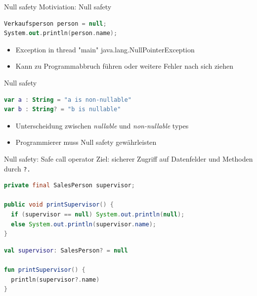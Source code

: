 \documentclass{beamer}
\begin{document}

\begin{frame}[fragile]{Null safety}
  Motiviation: Null safety
  \pause\vspace{1cm}
  \begin{lstlisting}[language=Kotlin, title=Java Beispiel, xleftmargin=1em]
Verkaufsperson person = null;
System.out.println(person.name);
  \end{lstlisting}
  \pause\vspace{1cm}
  \begin{itemize}[<+->]
    \item Exception in thread "main" java.lang.NullPointerException %
    \item Kann zu Programmabbruch führen oder weitere Fehler nach sich ziehen
  \end{itemize}
\end{frame}

\begin{frame}[fragile]{Null safety}
  \begin{lstlisting}[language=Kotlin]
var a : String = "a is non-nullable"
var b : String? = "b is nullable"
  \end{lstlisting}
  \pause \vspace{1cm}
  \begin{itemize}
    \item Unterscheidung zwischen \textit{nullable} und \textit{non-nullable} types
    \item Programmierer muss Null safety gewährleisten
  \end{itemize}
\end{frame}

\begin{frame}[fragile]{Null safety: Safe call operator}
  Ziel: sicherer Zugriff auf Datenfelder und Methoden durch \texttt{?.}
  \pause
  \begin{lstlisting}[language=Java, title=in Java]
private final SalesPerson supervisor;

public void printSupervisor() {
  if (supervisor == null) System.out.println(null);
  else System.out.println(supervisor.name);
}
  \end{lstlisting}
  \pause
  \begin{lstlisting}[language=Kotlin, title=in Kotlin]
val supervisor: SalesPerson? = null

fun printSupervisor() {
  println(supervisor?.name)
} 
  \end{lstlisting}
\end{frame}
\end{document}
